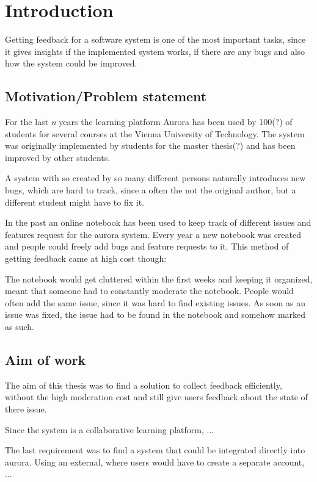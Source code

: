 \chapter{Introduction}

Getting feedback for a software system is one of the most important tasks, since it gives insights if the implemented system works, if there are any bugs and also how the system could be improved.

\section{Motivation/Problem statement}

For the last \emph{n} years the learning platform Aurora has been used by 100(?) of students for several courses at the Vienna University of Technology. The system was originally implemented by students for the master thesis(?) and has been improved by other students.

A system with so created by so many different persons naturally introduces new bugs, which are hard to track, since a often the not the original author, but a different student might have to fix it.

In the past an online notebook has been used to keep track of different issues and features request for the aurora system. Every year a new notebook was created and people could freely add bugs and feature requests to it. This method of getting feedback came at high cost though:

The notebook would get cluttered within the first weeks and keeping it organized, meant that someone had to constantly moderate the notebook.
People would often add the same issue, since it was hard to find existing issues.
As soon as an issue was fixed, the issue had to be found in the notebook and somehow marked as such. 


\section{Aim of work}

The aim of this thesis was to find a solution to collect feedback efficiently, without the high moderation cost and still give users feedback about the state of there issue.

Since the system is a collaborative learning platform, ...

The last requirement was to find a system that could be integrated directly into aurora. Using an external, where users would have to create a separate account, ...